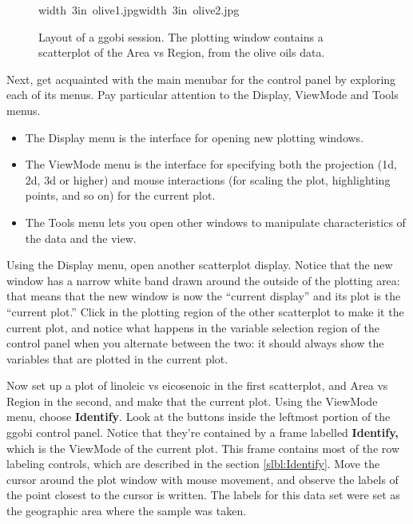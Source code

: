 \documentclass[11pt]{article}
\begin{document}
\begin{figure}[h]
\hbox{\pdfimage width 3in {olive1.jpg}\pdfimage width 3in {olive2.jpg}}
\caption{Layout of a ggobi session.  The plotting window contains a
scatterplot of the Area vs Region, from the olive oils data.
}%
\label{fig1}
\end{figure}

Next, get acquainted with the main menubar for the control panel by
exploring each of its menus.  Pay particular attention to the
Display, ViewMode and Tools menus.

\begin {itemize}
\item The Display menu is the interface for opening new plotting
  windows.
\item The ViewMode menu is the interface for specifying both the
  projection (1d, 2d, 3d or higher) and mouse interactions (for scaling
  the plot, highlighting points, and so on) for the current plot.
\item The Tools menu lets you open other windows to manipulate
  characteristics of the data and the view.
\end {itemize}

Using the Display menu, open another scatterplot display. Notice that
the new window has a narrow white band drawn around the outside of
the plotting area:  that means that the new window is now the
``current display'' and its plot is the ``current plot.''  Click in the
plotting region of the other scatterplot to make it the current plot,
and notice what happens in the variable selection region of the
control panel when you alternate between the two:  it should always show
the variables that are plotted in the current plot.

Now set up a plot of linoleic vs eicosenoic in the first scatterplot,
and Area vs Region in the second, and make that the current plot.
Using the ViewMode menu, choose {\bf Identify}. Look at the buttons
inside the leftmost portion of the ggobi control panel. Notice that
they're contained by a frame labelled {\bf Identify,} which is the
ViewMode of the current plot.  This frame contains most of the row
labeling controls, which are described in the section
\ref{slbl:Identify}. Move the cursor around the plot window with mouse
movement, and observe the labels of the point closest to the cursor is
written. The labels for this data set were set as the geographic area
where the sample was taken.
\end{document}
